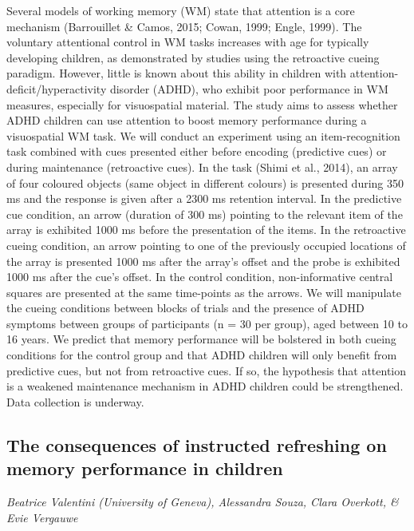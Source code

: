 \documentclass[12pt,]{book}
\begin{document}
Several models of working memory (WM) state that attention is a core mechanism (Barrouillet \& Camos, 2015; Cowan, 1999; Engle, 1999). The voluntary attentional control in WM tasks increases with age for typically developing children, as demonstrated by studies using the retroactive cueing paradigm. However, little is known about this ability in children with attention-deficit/hyperactivity disorder (ADHD), who exhibit poor performance in WM measures, especially for visuospatial material. The study aims to assess whether ADHD children can use attention to boost memory performance during a visuospatial WM task. We will conduct an experiment using an item-recognition task combined with cues presented either before encoding (predictive cues) or during maintenance (retroactive cues). In the task (Shimi et al., 2014), an array of four coloured objects (same object in different colours) is presented during 350 ms and the response is given after a 2300 ms retention interval. In the predictive cue condition, an arrow (duration of 300 ms) pointing to the relevant item of the array is exhibited 1000 ms before the presentation of the items. In the retroactive cueing condition, an arrow pointing to one of the previously occupied locations of the array is presented 1000 ms after the array's offset and the probe is exhibited 1000 ms after the cue's offset. In the control condition, non-informative central squares are presented at the same time-points as the arrows. We will manipulate the cueing conditions between blocks of trials and the presence of ADHD symptoms between groups of participants (n = 30 per group), aged between 10 to 16 years. We predict that memory performance will be bolstered in both cueing conditions for the control group and that ADHD children will only benefit from predictive cues, but not from retroactive cues. If so, the hypothesis that attention is a weakened maintenance mechanism in ADHD children could be strengthened. Data collection is underway.

\hypertarget{the-consequences-of-instructed-refreshing-on-memory-performance-in-children}{%
\subsection{The consequences of instructed refreshing on memory performance in children}\label{the-consequences-of-instructed-refreshing-on-memory-performance-in-children}}

\emph{Beatrice Valentini (University of Geneva), Alessandra Souza, Clara Overkott, \& Evie Vergauwe}
\end{document}
